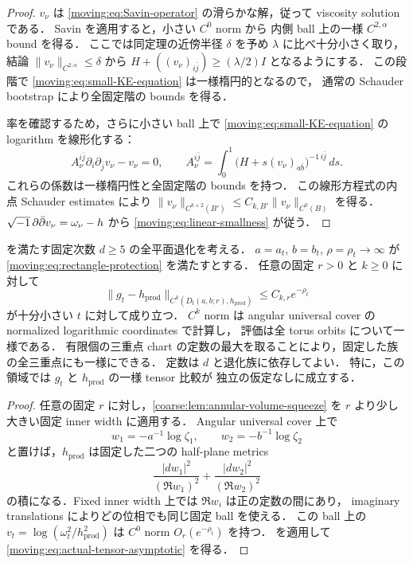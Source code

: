 \begin{proof}
$v_\nu$ は \eqref{moving:eq:Savin-operator} の滑らかな解，従って viscosity solution である．
Savin\cite[Theorem~1.3]{SavinSmall} を適用すると，小さい $C^0$ norm から
内側 ball 上の一様 $C^{2,\alpha}$ bound を得る．
ここでは同定理の近傍半径 $\delta$ を予め $\lambda$ に比べ十分小さく取り，
結論 $\|v_\nu\|_{C^{2,\alpha}}\le\delta$ から
$H+((v_\nu)_{i\bar j})\ge(\lambda/2)I$ となるようにする．
この段階で \eqref{moving:eq:small-KE-equation} は一様楕円的となるので，
通常の Schauder bootstrap により全固定階の bounds を得る．

率を確認するため，さらに小さい ball 上で
\eqref{moving:eq:small-KE-equation} の logarithm を線形化する：
\[
 A_\nu^{i\bar j}\partial_i\partial_{\bar j}v_\nu-v_\nu=0,
 \qquad
 A_\nu^{i\bar j}
 =\int_0^1\bigl(H+s(v_\nu)_{a\bar b}\bigr)^{-1\,i\bar j}\,ds.
\]
これらの係数は一様楕円性と全固定階の bounds を持つ．
この線形方程式の内点 Schauder estimates により
$\|v_\nu\|_{C^{k+2}(B')}\le C_{k,B'}\|v_\nu\|_{C^0(B)}$
を得る．$\sqrt{-1}\,\partial\bar\partial v_\nu=\omega_\nu-h$ から
\eqref{moving:eq:linear-smallness} が従う．
\end{proof}

\begin{theorem}
\label{coarse:thm:moving-triple-tensor}
 を満たす固定次数 $d\ge5$ の全平面退化を考える．
$a=a_t$, $b=b_t$, $\rho=\rho_t\to\infty$ が
\eqref{moving:eq:rectangle-protection} を満たすとする．
任意の固定 $r>0$ と $k\ge0$ に対して
\begin{equation}\label{moving:eq:actual-tensor-asymptotic}
 \|g_t-h_{\mathrm{prod}}\|_{C^k(D_t(a,b;r),h_{\mathrm{prod}})}
 \le C_{k,r}e^{-\rho_t}
\end{equation}
が十分小さい $t$ に対して成り立つ．
$C^k$ norm は angular universal cover の normalized logarithmic coordinates で計算し，
評価は全 torus orbits について一様である．
有限個の三重点 chart の定数の最大を取ることにより，固定した族の全三重点にも一様にできる．
定数は $d$ と退化族に依存してよい．
特に，この領域では $g_t$ と $h_{\mathrm{prod}}$ の一様 tensor 比較が
独立の仮定なしに成立する．
\end{theorem}

\begin{proof}
任意の固定 $r$ に対し，\cref{coarse:lem:annular-volume-squeeze} を
$r$ より少し大きい固定 inner width に適用する．
Angular universal cover 上で
\[
 w_1=-a^{-1}\log \zeta_1,\qquad
 w_2=-b^{-1}\log \zeta_2
\]
と置けば，$h_{\mathrm{prod}}$ は固定した二つの half-plane metrics
\[
 \frac{|dw_1|^2}{(\Re w_1)^2}
 +\frac{|dw_2|^2}{(\Re w_2)^2}
\]
の積になる．Fixed inner width 上では $\Re w_i$ は正の定数の間にあり，
imaginary translations によりどの位相でも同じ固定 ball を使える．
この ball 上の
$v_t=\log(\omega_t^2/h_{\mathrm{prod}}^2)$ は
$C^0$ norm $O_r(e^{-\rho_t})$ を持つ．
 を適用して
\eqref{moving:eq:actual-tensor-asymptotic} を得る．
\end{proof}

